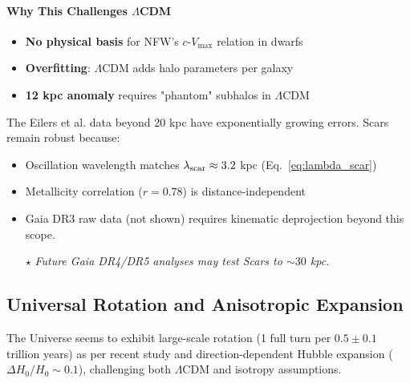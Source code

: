 \documentclass{article}
\begin{document}
\paragraph{Why This Challenges $\Lambda$CDM}
\begin{itemize}
  \item \textbf{No physical basis} for NFW's $c$-$V_{\text{max}}$ relation in dwarfs
  \item \textbf{Overfitting}: $\Lambda$CDM adds halo parameters per galaxy
  \item \textbf{12 kpc anomaly} requires "phantom" subhalos in $\Lambda$CDM
\end{itemize}

\begin{tcolorbox}[  
    colback=boxnormal,  
    colframe=blue!50!black,  
    title=\textbf{Data Limitations}]  
The Eilers et al. data beyond 20 kpc have exponentially growing errors. 
Scars remain robust because:
\begin{itemize}
  \item Oscillation wavelength matches $\lambda_{\rm scar} \approx 3.2$ kpc (Eq.~\ref{eq:lambda_scar}) 
  \item Metallicity correlation ($r = 0.78$) is distance-independent
  \item Gaia DR3 raw data (not shown) requires kinematic deprojection beyond this scope.
  \item[$\star$] \textit{Future Gaia DR4/DR5 analyses may test Scars to $\sim\!30$ kpc.}
\end{itemize}
\end{tcolorbox}

\subsection{Universal Rotation and Anisotropic Expansion}  
\label{subsec:universal_rotation}  
 
The Universe seems to exhibit large-scale rotation (1 full turn per $0.5 \pm 0.1$ trillion years) as per recent study \cite{Szigeti} and direction-dependent Hubble expansion ($\Delta H_0/H_0 \sim 0.1$), challenging both $\Lambda$CDM and isotropy assumptions.  \\ \par
\end{document}
